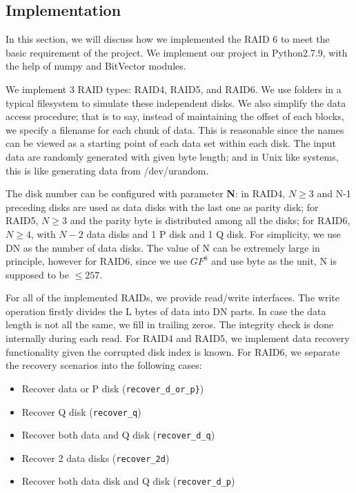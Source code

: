 \subsection{Implementation}

In this section, we will discuss how we implemented the RAID 6 to meet the basic requirement of the project.
We implement our project in Python2.7.9, with the help of numpy and BitVector modules.

We implement 3 RAID types: RAID4, RAID5, and RAID6. We use folders in a typical filesystem to simulate these independent disks. We also simplify the data access procedure; that is to say, instead of maintaining the offset of each blocks, we specify a filename for each chunk of data. This is reasonable since the names can be viewed as a starting point of each data set within each disk. The input data are randomly generated with given byte length; and in Unix like systems, this is like generating data from /dev/urandom.

The disk number can be configured with parameter \textbf{N}: in RAID4, $N\ge 3$ and N-1 preceding disks are used as data disks with the last one as parity disk; for RAID5, $N\ge 3$ and the parity byte is distributed among all the disks;  for RAID6, $N\ge 4$, with $N-2$ data disks and 1 P disk and 1 Q disk. For simplicity, we use DN as the number of data disks. The value of N can be extremely large in principle, however for RAID6, since we use $GF^8$ and use byte as the unit, N is supposed to be $\le 257$.

For all of the implemented RAIDs, we provide read/write interfaces. The write operation firstly divides the L bytes of data into DN parts. In case the data length is not all the same, we fill in trailing zeros.
The integrity check is done internally during each read. For RAID4 and RAID5, we implement data recovery functionality given the corrupted disk index is known. For RAID6, we separate the recovery scenarios into the following cases:

\begin{itemize}
	\item Recover data or P disk (\verb|recover_d_or_p}|)
	\item Recover Q disk (\verb|recover_q|)
	\item Recover both data and Q disk (\verb|recover_d_q|)
	\item Recover 2 data disks (\verb|recover_2d|)
	\item Recover both data disk and Q disk (\verb|recover_d_p|)
\end{itemize}




